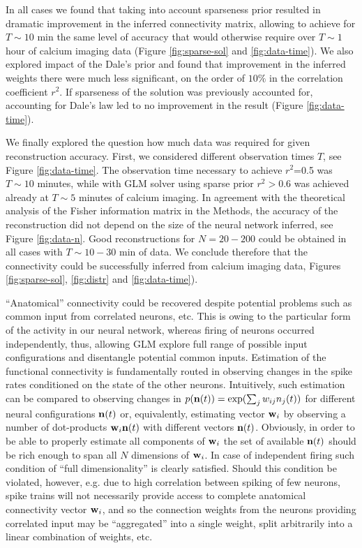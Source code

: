 In all cases we found that taking into account sparseness prior resulted in dramatic improvement in the inferred connectivity matrix, allowing to achieve for $T\sim 10$ min the same level of accuracy that would otherwise require over $T\sim 1$ hour of calcium imaging data (Figure \ref{fig:sparse-sol} and \ref{fig:data-time}). We also explored impact of the Dale's prior and found that improvement in the inferred weights there were much less significant, on the order of $10\%$ in the correlation coefficient $r^2$. If sparseness of the solution was previously accounted for, accounting for Dale's law led to no improvement in the result (Figure \ref{fig:data-time}).

We finally explored the question how much data was required for given reconstruction accuracy. First, we considered different observation times $T$, see Figure \ref{fig:data-time}. The observation time necessary to achieve $r^2$=0.5 was $T\sim 10$ minutes, while with GLM solver using sparse prior $r^2>0.6$ was achieved already at $T\sim 5$ minutes of calcium imaging. In agreement with the theoretical analysis of the Fisher information matrix in the Methods, the accuracy of the reconstruction did not depend on the size of the neural network inferred, see Figure \ref{fig:data-n}. Good reconstructions for $N=20-200$ could be obtained in all cases with $T\sim 10-30$ min of data. We conclude therefore that the connectivity could be successfully inferred from calcium imaging data, Figures \ref{fig:sparse-sol}, \ref{fig:distr} and \ref{fig:data-time}).

``Anatomical'' connectivity could be recovered despite potential problems such as common input from correlated neurons, etc. This is owing to the particular form of the activity in our neural network, whereas firing of neurons occurred independently, thus, allowing GLM explore full range of possible input configurations and disentangle potential common inputs.  Estimation of the functional connectivity is fundamentally routed in observing changes in the spike rates conditioned on the state of the other neurons. Intuitively, such estimation can be compared to observing changes in $p({\bf n}(t))=\exp(\sum_j w_{ij}n_j(t))$ for different neural configurations ${\bf n}(t)$ or, equivalently, estimating vector ${\bf w}_i$ by observing a number of dot-products ${\bf w}_i {\bf n}(t)$ with different vectors ${\bf n}(t)$. Obviously, in order to be able to properly estimate all components of ${\bf w}_i$ the set of available ${\bf n}(t)$ should be rich enough to span all $N$ dimensions of ${\bf w}_i$. In case of independent firing such condition of ``full dimensionality'' is clearly satisfied.  Should this condition be violated, however, e.g. due to high correlation between spiking of few neurons, spike trains will not necessarily provide access to complete anatomical connectivity vector ${\bf w}_i$, and so the connection weights from the neurons providing correlated input may be ``aggregated'' into a single weight, split arbitrarily into a linear combination of weights, etc.

